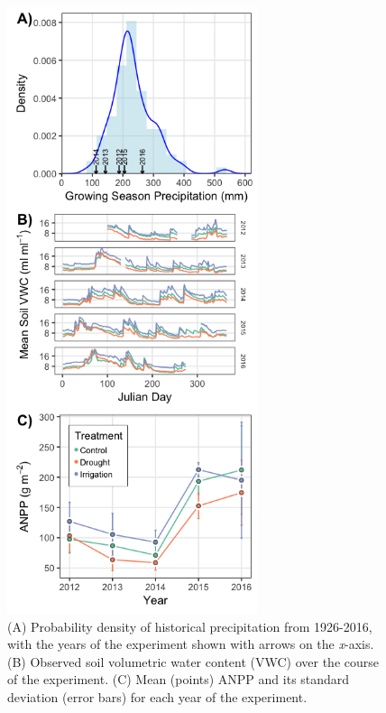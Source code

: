 \documentclass[fleqn,10pt,lineno]{wlpeerj} %
\begin{document}
\begin{figure}[!ht]
  \centering
      \includegraphics[height=7in]{../figures/data_panels.png}
  \caption{(A) Probability density of historical precipitation from 1926-2016, with the years of the experiment shown with arrows on the \emph{x}-axis. (B) Observed soil volumetric water content (VWC) over the course of the experiment. (C) Mean (points) ANPP and its standard deviation (error bars) for each year of the experiment.}
\end{figure}

\newpage{}
\end{document}
